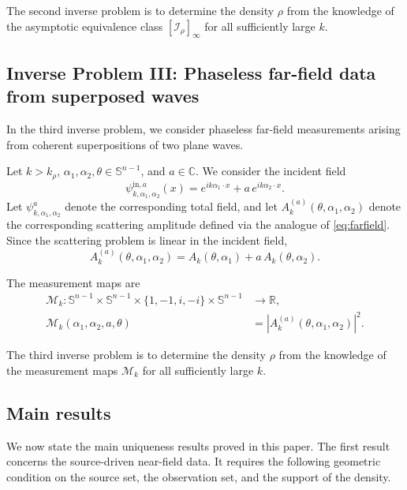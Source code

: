 \documentclass[12pt,a4paper]{amsart}
\numberwithin{equation}{section}
\theoremstyle{plain}
\theoremstyle{definition}
\begin{document}
The second inverse problem is to determine the density $\rho$ from the knowledge of the asymptotic equivalence
class $[\mathcal I_\rho]_\infty$ for all sufficiently large $k$.


\subsection{Inverse Problem III: Phaseless far-field data from superposed waves}

In the third inverse problem, we consider phaseless far-field measurements arising from coherent superpositions of two plane waves.

Let $k>k_\rho$, $\alpha_1,\alpha_2,\theta\in\mathbb{S}^{n-1}$, and $a\in\mathbb{C}$. We consider the incident field
\begin{equation*}
    \psi^{\mathrm{in},a}_{k,\alpha_1,\alpha_2}(x)
    =
    e^{ik\alpha_1\cdot x}
    +
    a\,e^{ik\alpha_2\cdot x}.
\end{equation*}
Let $\psi^a_{k,\alpha_1,\alpha_2}$ denote the corresponding total field, and let $A_k^{(a)}(\theta,\alpha_1,\alpha_2)$ denote the corresponding scattering amplitude defined via the analogue of \eqref{eq:farfield}. Since the scattering problem is linear in the incident field,
\begin{equation}\label{eq:superposition_amplitude}
    A_k^{(a)}(\theta,\alpha_1,\alpha_2)
    =
    A_k(\theta,\alpha_1)
    +
    a\,A_k(\theta,\alpha_2).
\end{equation}


The measurement maps are
\begin{align*}
    \mathcal M_k:
    \mathbb S^{n-1}\times\mathbb S^{n-1}
    \times \{1,-1,i,-i\}
    \times \mathbb S^{n-1}
    &\to \mathbb R,\\
    \mathcal M_k(\alpha_1,\alpha_2,a,\theta)
    &=
    \left|A_k^{(a)}(\theta,\alpha_1,\alpha_2)\right|^2.
\end{align*}

The third inverse problem is to determine the density $\rho$ from the knowledge
of the measurement maps $\mathcal M_k$ for all sufficiently large $k$.

\subsection{Main results}
We now state the main uniqueness results proved in this paper. The first result
concerns the source-driven near-field data. It requires the following geometric
condition on the source set, the observation set, and the support of the density.
\end{document}

